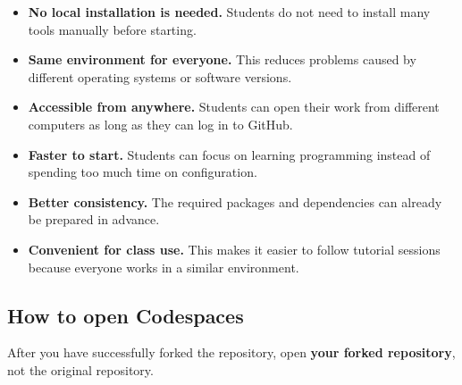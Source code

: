 \begin{itemize}
    \item \textbf{No local installation is needed.} Students do not need to install many tools manually before starting.
    \item \textbf{Same environment for everyone.} This reduces problems caused by different operating systems or software versions.
    \item \textbf{Accessible from anywhere.} Students can open their work from different computers as long as they can log in to GitHub.
    \item \textbf{Faster to start.} Students can focus on learning programming instead of spending too much time on configuration.
    \item \textbf{Better consistency.} The required packages and dependencies can already be prepared in advance.
    \item \textbf{Convenient for class use.} This makes it easier to follow tutorial sessions because everyone works in a similar environment.
\end{itemize}

\subsection*{How to open Codespaces}

After you have successfully forked the repository, open \textbf{your forked repository}, not the original repository.

